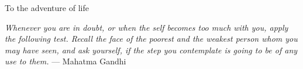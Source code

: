 %
\begin{frontmatter}

%
%

\makefrontmatter

%
%
%
%
%
%
\begin{dedication}
  To the adventure of life
\end{dedication}


%
%



%
%
\begin{epigraph} %

\emph{Whenever you are in doubt, or when the self becomes too much with you, apply the following test. Recall the face of the poorest and the weakest person whom you may have seen, and ask yourself, if the step you contemplate is going to be of any use to them.}
--- Mahatma Gandhi


\end{epigraph}
\end{frontmatter}
